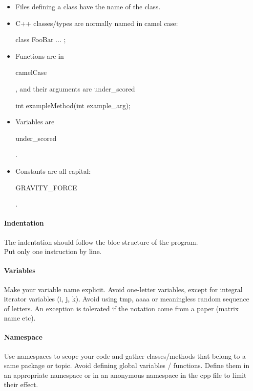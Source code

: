 \begin{itemize}
\item Files defining a class have the name of the class.
\item C++ classes/types are normally named in camel case:\\
\begin{tt}
class FooBar { ... };
\end{tt}
\item Functions are in \begin{tt}camelCase\end{tt}, and their arguments are under\_scored\\
\begin{tt}
int exampleMethod(int example\_arg);
\end{tt}

\item Variables are \begin{tt}under\_scored\end{tt}.

\item Constants are all capital: \begin{tt}GRAVITY\_FORCE\end{tt}.
\end{itemize}

\paragraph{Indentation}
The indentation should follow the bloc structure of the program.\\
Put only one instruction by line.

\paragraph{Variables}
Make your variable name explicit.
Avoid one-letter variables, except for integral iterator variables (i, j, k).
Avoid using tmp, aaaa or meaningless random sequence of letters.
An exception is tolerated if the notation come from a paper (matrix name etc). 

\paragraph{Namespace}
Use namespaces to scope your code and gather classes/methods that belong to a same package or topic.
Avoid defining global variables / functions. 
Define them in an appropriate namespace or in an anonymous namespace in the cpp file to limit their effect.

